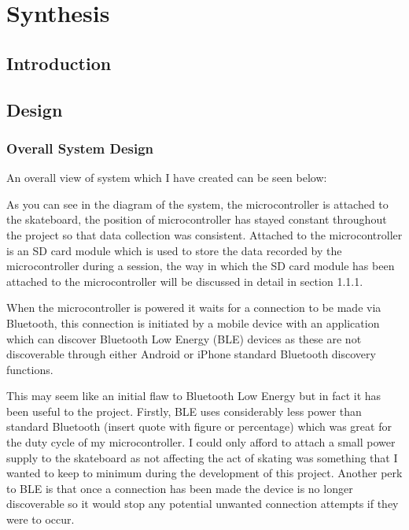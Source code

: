 \chapter{Synthesis}\label{synthesis}

\section{Introduction}\label{introduction}



\section{Design}\label{design}

\subsection{Overall System Design}\label{overallsystemdesign}

An overall view of system which I have created can be seen below: 


As you can see in the diagram of the system, the microcontroller is attached to the skateboard, the position of microcontroller has stayed constant throughout the project so that data collection was consistent. Attached to the microcontroller is an SD card module which is used to store the data recorded by the microcontroller during a session, the way in which the SD card module has been attached to the microcontroller will be discussed in detail in section 1.1.1.

When the microcontroller is powered it waits for a connection to be made via Bluetooth, this connection is initiated by a mobile device with an application which can discover Bluetooth Low Energy (BLE) devices as these are not discoverable through either Android or iPhone standard Bluetooth discovery functions. 

This may seem like an initial flaw to Bluetooth Low Energy but in fact it has been useful to the project. Firstly, BLE uses considerably less power than standard Bluetooth (insert quote with figure or percentage) which was great for the duty cycle of my microcontroller. I could only afford to attach a small power supply to the skateboard as not affecting the act of skating was something that I wanted to keep to minimum during the development of this project. Another perk to BLE is that once a connection has been made the device is no longer discoverable so it would stop any potential unwanted connection attempts if they were to occur.

